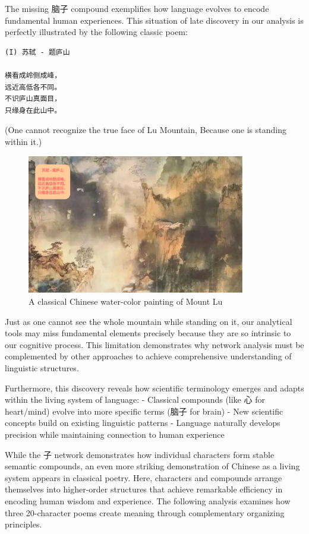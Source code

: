 \documentclass[
  11pt,
  letterpaper,
]{article}
\begin{document}
The missing 脑子 compound exemplifies how language evolves to encode
fundamental human experiences. This situation of late discovery in our
analysis is perfectly illustrated by the following classic poem:

\begin{verbatim}
(I) 苏轼 - 题庐山

横看成岭侧成峰，
远近高低各不同。
不识庐山真面目，
只缘身在此山中。
\end{verbatim}

(One cannot recognize the true face of Lu Mountain, Because one is
standing within it.)

\begin{figure}
\centering
\includegraphics[width=0.85\textwidth]{./images/poem_lu-shan.png}
\caption{A classical Chinese water-color painting of Mount Lu}
\end{figure}

Just as one cannot see the whole mountain while standing on it, our
analytical tools may miss fundamental elements precisely because they
are so intrinsic to our cognitive process. This limitation demonstrates
why network analysis must be complemented by other approaches to achieve
comprehensive understanding of linguistic structures.

Furthermore, this discovery reveals how scientific terminology emerges
and adapts within the living system of language: - Classical compounds
(like 心 for heart/mind) evolve into more specific terms (脑子 for
brain) - New scientific concepts build on existing linguistic patterns -
Language naturally develops precision while maintaining connection to
human experience

While the 子 network demonstrates how individual characters form stable
semantic compounds, an even more striking demonstration of Chinese as a
living system appears in classical poetry. Here, characters and
compounds arrange themselves into higher-order structures that achieve
remarkable efficiency in encoding human wisdom and experience. The
following analysis examines how three 20-character poems create meaning
through complementary organizing principles.
\end{document}
